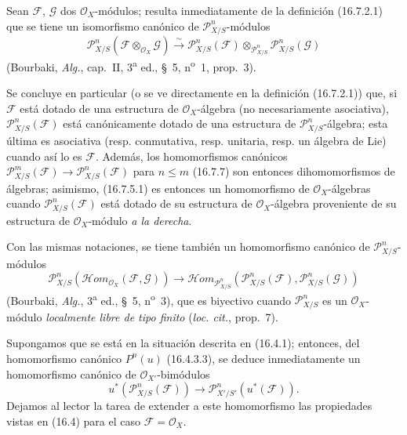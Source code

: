 
\begin{env}[16.7.8]
\label{IV.16.7.8}
Sean $\mathscr{F}$, $\mathscr{G}$ dos $\mathcal{O}_X$-módulos; resulta
inmediatamente de la definición (16.7.2.1) que se tiene un isomorfismo canónico de
$\mathscr{P}_{X/S}^n$-módulos
\[
  \mathscr{P}_{X/S}^n(\mathscr{F}\otimes_{\mathcal{O}_X}\mathscr{G})
  \xrightarrow{\sim}
  \mathscr{P}_{X/S}^n(\mathscr{F})
  \otimes_{\mathscr{P}_{X/S}^n}\mathscr{P}_{X/S}^n(\mathscr{G})
  \tag{16.7.8.1}
  \label{IV.16.7.8.1}
\]
(Bourbaki, \emph{Alg.}, cap.~II, 3\textsuperscript{a} ed., §~5,
n\textsuperscript{o}~1, prop.~3).

Se concluye en particular (o se ve directamente en la definición
(16.7.2.1)) que, si $\mathscr{F}$ está dotado de una estructura de
$\mathcal{O}_X$-álgebra (no necesariamente asociativa),
$\mathscr{P}_{X/S}^n(\mathscr{F})$ está canónicamente dotado de una estructura de
$\mathscr{P}_{X/S}^n$-álgebra; esta última es asociativa (resp.
conmutativa, resp. unitaria, resp. un álgebra de Lie) cuando así lo es
$\mathscr{F}$. Además, los homomorfismos canónicos
$\mathscr{P}_{X/S}^m(\mathscr{F})\to\mathscr{P}_{X/S}^n(\mathscr{F})$ para
$n\leq m$ (16.7.7) son entonces dihomomorfismos de álgebras; asimismo,
(16.7.5.1) es entonces un homomorfismo de $\mathcal{O}_X$-álgebras cuando
$\mathscr{P}_{X/S}^n(\mathscr{F})$ está dotado de su estructura de
$\mathcal{O}_X$-álgebra proveniente de su estructura de $\mathcal{O}_X$-módulo
\emph{a la derecha}.

Con las mismas notaciones, se tiene también un homomorfismo canónico de
$\mathscr{P}_{X/S}^n$-módulos
\[
  \mathscr{P}_{X/S}^n
  (\mathscr{H}\!om_{\mathcal{O}_X}(\mathscr{F},\mathscr{G}))
  \longrightarrow
  \mathscr{H}\!om_{\mathscr{P}_{X/S}^n}
  (\mathscr{P}_{X/S}^n(\mathscr{F}),\mathscr{P}_{X/S}^n(\mathscr{G}))
  \tag{16.7.8.2}
  \label{IV.16.7.8.2}
\]
(Bourbaki, \emph{Alg.}, 3\textsuperscript{a} ed., §~5,
n\textsuperscript{o}~3), que es biyectivo cuando $\mathscr{P}_{X/S}^n$ es
un $\mathcal{O}_X$-módulo \emph{localmente libre de tipo finito}
(\emph{loc. cit.}, prop.~7).
\end{env}

\begin{env}[16.7.9]
\label{IV.16.7.9}
Supongamos que se está en la situación descrita en (16.4.1); entonces, del
homomorfismo canónico $P^n(u)$ (16.4.3.3), se deduce inmediatamente un
homomorfismo canónico de $\mathcal{O}_{X'}$-bimódulos
\[
  u^*(\mathscr{P}_{X/S}^n(\mathscr{F}))
  \longrightarrow
  \mathscr{P}_{X'/S'}^n(u^*(\mathscr{F})).
  \tag{16.7.9.1}
  \label{IV.16.7.9.1}
\]
Dejamos al lector la tarea de extender a este homomorfismo las propiedades
vistas en (16.4) para el caso $\mathscr{F}=\mathcal{O}_X$.
\end{env}

